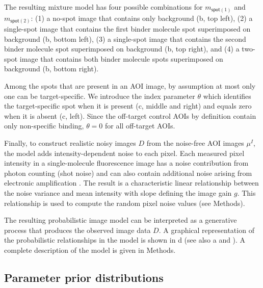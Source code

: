 The resulting mixture model has four possible combinations for $m_{\mathsf{spot}(1)}$ and $m_{\mathsf{spot}(2)}$: (1) a no-spot image that contains only background (b, top left), (2) a single-spot image that contains the first binder molecule spot superimposed on background (b, bottom left), (3) a single-spot image that contains the second binder molecule spot superimposed on background (b, top right), and (4) a two-spot image that contains both binder molecule spots superimposed on background (b, bottom right).

Among the spots that are present in an AOI image, by assumption at most only one can be target-specific. We introduce the index parameter $\theta$ which identifies the target-specific spot  when it is present (c, middle and right) and equals zero when it is absent (c, left). Since the off-target control AOIs by definition contain only non-specific binding, $\theta = 0$ for all off-target AOIs. 

Finally, to construct realistic noisy images $D$ from the noise-free AOI images $\mu^I$, the model adds intensity-dependent noise to each pixel.  Each measured pixel intensity in a single-molecule fluorescence image has a noise contribution from photon counting (shot noise) and can also contain additional noise arising from electronic amplification \citep{Van_Vliet1998-jk}. The result is a characteristic linear relationship between the noise variance and mean intensity with slope defining the image gain $g$. This relationship is used to compute the random pixel noise values (see Methods).

The resulting probabilistic image model can be interpreted as a generative process that produces the observed image data $D$. A graphical representation of the probabilistic relationships in the model is shown in d (see also a and ). A complete description of the model is given in Methods.  

\subsection{Parameter prior distributions}


